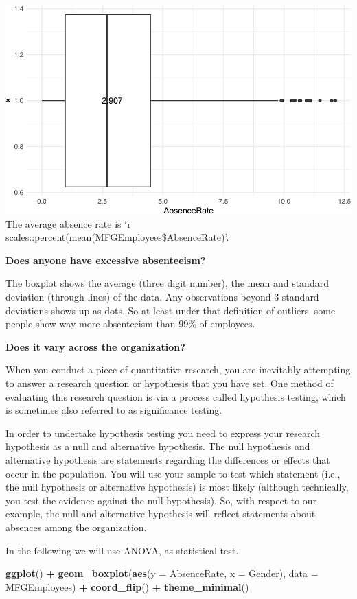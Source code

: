 \documentclass[12pt, krantz2,]{krantz}
\makeatletter
\newenvironment{Shaded}{\begin{snugshade}}{\end{snugshade}}
\newcommand{\DataTypeTok}[1]{\textcolor[rgb]{0.27,0.27,0.27}{#1}}
\newcommand{\KeywordTok}[1]{\textcolor[rgb]{0.27,0.27,0.27}{\textbf{#1}}}
\newcommand{\NormalTok}[1]{#1}
\newcommand{\OperatorTok}[1]{\textcolor[rgb]{0.43,0.43,0.43}{\textbf{#1}}}
\newcommand{\StringTok}[1]{\textcolor[rgb]{0.5,0.5,0.5}{#1}}
\newenvironment{kframe}{%
\medskip{}
\setlength{\fboxsep}{.8em}
 \def\at@end@of@kframe{}%
 \ifinner\ifhmode%
  \def\at@end@of@kframe{\end{minipage}}%
  \begin{minipage}{\columnwidth}%
 \fi\fi%
 \def\FrameCommand##1{\hskip\@totalleftmargin \hskip-\fboxsep
 \colorbox{shadecolor}{##1}\hskip-\fboxsep
     \hskip-\linewidth \hskip-\@totalleftmargin \hskip\columnwidth}%
 \MakeFramed {\advance\hsize-\width
   \@totalleftmargin\z@ \linewidth\hsize
   \@setminipage}}%
 {\par\unskip\endMakeFramed%
 \at@end@of@kframe}
\renewenvironment{Shaded}{\begin{kframe}}{\end{kframe}}
\makeatother
\begin{document}
\includegraphics[width=\textwidth]{hendrikfeddersen_files/figure-latex/unnamed-chunk-8-1}
The average absence rate is `r scales::percent(mean(MFGEmployees\$AbsenceRate)'.

\textbf{Does anyone have excessive absenteeism?}

The boxplot shows the average (three digit number), the mean and standard deviation (through lines) of the data. Any observations beyond 3 standard deviations shows up as dots. So at least under that definition of outliers, some people show way more absenteeism than 99\% of employees.

\textbf{Does it vary across the organization?}

When you conduct a piece of quantitative research, you are inevitably attempting to answer a research question or hypothesis that you have set. One method of evaluating this research question is via a process called hypothesis testing, which is sometimes also referred to as significance testing.

In order to undertake hypothesis testing you need to express your research hypothesis as a null and alternative hypothesis. The null hypothesis and alternative hypothesis are statements regarding the differences or effects that occur in the population. You will use your sample to test which statement (i.e., the null hypothesis or alternative hypothesis) is most likely (although technically, you test the evidence against the null hypothesis). So, with respect to our example, the null and alternative hypothesis will reflect statements about absences among the organization.

In the following we will use ANOVA, as statistical test.

\begin{Shaded}
\begin{Highlighting}[]
\KeywordTok{ggplot}\NormalTok{() }\OperatorTok{+}\StringTok{ }
\StringTok{  }\KeywordTok{geom_boxplot}\NormalTok{(}\KeywordTok{aes}\NormalTok{(}\DataTypeTok{y =}\NormalTok{ AbsenceRate, }\DataTypeTok{x =}\NormalTok{ Gender), }\DataTypeTok{data =}\NormalTok{ MFGEmployees) }\OperatorTok{+}\StringTok{ }
\StringTok{  }\KeywordTok{coord_flip}\NormalTok{() }\OperatorTok{+}
\StringTok{  }\KeywordTok{theme_minimal}\NormalTok{()}
\end{Highlighting}
\end{Shaded}
\end{document}
